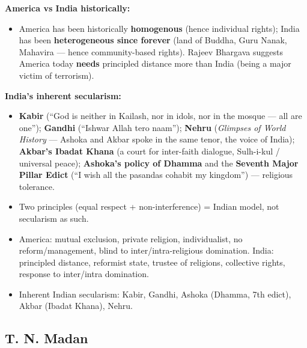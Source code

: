 \begin{CriticalPoint}
\textbf{America vs India historically:}
\begin{itemize}
\item America has been historically \textbf{homogenous} (hence individual rights); India has been \textbf{heterogeneous since forever} (land of Buddha, Guru Nanak, Mahavira --- hence community-based rights). Rajeev Bhargava suggests America today \textbf{needs} principled distance more than India (being a major victim of terrorism).
\end{itemize}
\end{CriticalPoint}

\begin{DataFact}
\textbf{India's inherent secularism:}
\begin{itemize}
\item \textbf{Kabir} (``God is neither in Kailash, nor in idols, nor in the mosque --- all are one''); \textbf{Gandhi} (``Ishwar Allah tero naam''); \textbf{Nehru} (\textit{Glimpses of World History} --- Ashoka and Akbar spoke in the same tenor, the voice of India); \textbf{Akbar's Ibadat Khana} (a court for inter-faith dialogue, Sulh-i-kul / universal peace); \textbf{Ashoka's policy of Dhamma} and the \textbf{Seventh Major Pillar Edict} (``I wish all the pasandas cohabit my kingdom'') --- religious tolerance.
\end{itemize}
\end{DataFact}

\begin{QuickRevision}
\begin{itemize}
\item Two principles (equal respect + non-interference) = Indian model, not secularism as such.
\item America: mutual exclusion, private religion, individualist, no reform/management, blind to inter/intra-religious domination. India: principled distance, reformist state, trustee of religions, collective rights, response to inter/intra domination.
\item Inherent Indian secularism: Kabir, Gandhi, Ashoka (Dhamma, 7th edict), Akbar (Ibadat Khana), Nehru.
\end{itemize}
\end{QuickRevision}

\sectiondivider

\subsection{T. N. Madan}

